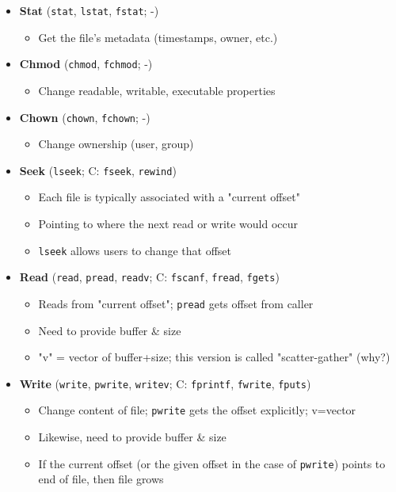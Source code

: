 \documentclass[openany,12pt]{book}
\begin{document}
\begin{itemize}
    \item \textbf{Stat} (\texttt{stat}, \texttt{lstat}, \texttt{fstat}; -)
    \begin{itemize}
        \item Get the file's metadata (timestamps, owner, etc.)
    \end{itemize}

    \item \textbf{Chmod} (\texttt{chmod}, \texttt{fchmod}; -)
    \begin{itemize}
        \item Change readable, writable, executable properties
    \end{itemize}
    
    \item \textbf{Chown} (\texttt{chown}, \texttt{fchown}; -)
    \begin{itemize}
        \item Change ownership (user, group)
    \end{itemize}

    \item \textbf{Seek} (\texttt{lseek}; C: \texttt{fseek}, \texttt{rewind})
    \begin{itemize}
        \item Each file is typically associated with a "current offset"
        \item Pointing to where the next read or write would occur
        \item \texttt{lseek} allows users to change that offset
    \end{itemize}

    \item \textbf{Read} (\texttt{read}, \texttt{pread}, \texttt{readv}; C: \texttt{fscanf}, \texttt{fread}, \texttt{fgets})
    \begin{itemize}
        \item Reads from "current offset"; \texttt{pread} gets offset from caller
        \item Need to provide buffer \& size
        \item "v" = vector of buffer+size; this version is called "scatter-gather" (why?)
    \end{itemize}

    \item \textbf{Write} (\texttt{write}, \texttt{pwrite}, \texttt{writev}; C: \texttt{fprintf}, \texttt{fwrite}, \texttt{fputs})
    \begin{itemize}
        \item Change content of file; \texttt{pwrite} gets the offset explicitly; v=vector
        \item Likewise, need to provide buffer \& size
        \item If the current offset (or the given offset in the case of \texttt{pwrite}) points to end of file, then file grows
    \end{itemize}


\end{itemize}
\end{document}
